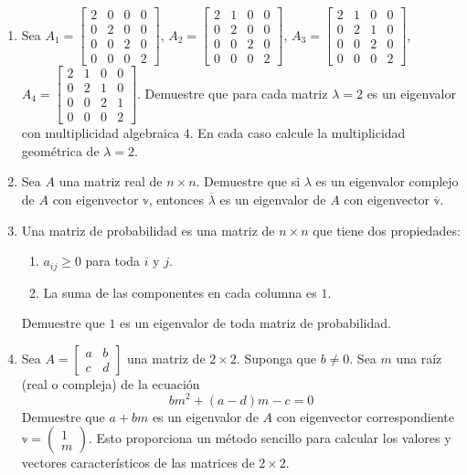 \begin{enumerate}[resume]
    \item Sea $A_{1}=\begin{bmatrix*}2 & 0 & 0 & 0 \\ 0 & 2 & 0 & 0 \\ 0 & 0 & 2 & 0 \\ 0 & 0 & 0 & 2\end{bmatrix*}$, $A_{2}=\begin{bmatrix*}2 & 1 & 0 & 0 \\ 0 & 2 & 0 & 0 \\ 0 & 0 & 2 & 0 \\ 0 & 0 & 0 & 2\end{bmatrix*}$, $A_{3}=\begin{bmatrix*}2 & 1 & 0 & 0 \\ 0 & 2 & 1 & 0 \\ 0 & 0 & 2 & 0 \\ 0 & 0 & 0 & 2\end{bmatrix*}$, $A_{4}=\begin{bmatrix*}2 & 1 & 0 & 0 \\ 0 & 2 & 1 & 0 \\ 0 & 0 & 2 & 1 \\ 0 & 0 & 0 & 2\end{bmatrix*}$.
    Demuestre que para cada matriz $\lambda=2$ es un eigenvalor con multiplicidad algebraica $4$. En cada caso calcule la multiplicidad geométrica de $\lambda=2$.
    \item Sea $A$ una matriz real de $n \times n$. Demuestre que si $\lambda$ es un eigenvalor complejo de $A$ con eigenvector $\mathbb{v}$, entonces $\overline{\lambda}$ es un eigenvalor de $A$ con eigenvector $\overline{\mathbb{v}}$.
    \item Una matriz de probabilidad es una matriz de $n \times n$ que tiene dos propiedades:
    \begin{enumerate}
        \item $a_{i j} \geq 0$ para toda $i$ y $j$.
        \item La suma de las componentes en cada columna es $1$.
    \end{enumerate}
    Demuestre que $1$ es un eigenvalor de toda matriz de probabilidad.
    \item Sea $A=\begin{bmatrix*}a & b \\ c & d\end{bmatrix*}$ una matriz de $2 \times 2$. Suponga que $b \neq 0$. Sea $m$ una raíz (real o compleja) de la ecuación
    $$b m^{2}+(a-d) m-c=0$$
    Demuestre que $a+b m$ es un eigenvalor de $A$ con eigenvector correspondiente $\mathbb{v}=\begin{pmatrix*}1 \\ m\end{pmatrix*}$. Esto proporciona un método sencillo para calcular los valores y vectores característicos de las matrices de $2 \times 2$.

\end{enumerate}

